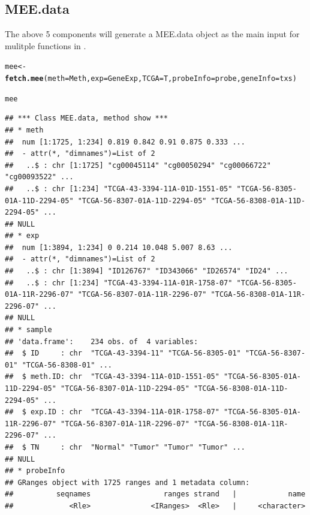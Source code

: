 \documentclass{article}\usepackage[]{graphicx}\usepackage[usenames,dvipsnames]{color}
\makeatletter
\newcommand{\hlstd}[1]{\textcolor[rgb]{0.345,0.345,0.345}{#1}}%
\newcommand{\hlkwb}[1]{\textcolor[rgb]{0.69,0.353,0.396}{#1}}%
\newcommand{\hlkwc}[1]{\textcolor[rgb]{0.333,0.667,0.333}{#1}}%
\newcommand{\hlkwd}[1]{\textcolor[rgb]{0.737,0.353,0.396}{\textbf{#1}}}%
\newenvironment{kframe}{%
 \def\at@end@of@kframe{}%
 \ifinner\ifhmode%
  \def\at@end@of@kframe{\end{minipage}}%
  \begin{minipage}{\columnwidth}%
 \fi\fi%
 \def\FrameCommand##1{\hskip\@totalleftmargin \hskip-\fboxsep
 \colorbox{shadecolor}{##1}\hskip-\fboxsep
     \hskip-\linewidth \hskip-\@totalleftmargin \hskip\columnwidth}%
 \MakeFramed {\advance\hsize-\width
   \@totalleftmargin\z@ \linewidth\hsize
   \@setminipage}}%
 {\par\unskip\endMakeFramed%
 \at@end@of@kframe}
\newenvironment{knitrout}{}{} %
\makeatother
\begin{document}
\subsection{MEE.data}
The above 5 components will generate a MEE.data object as the main input for mulitple functions 
in .

\begin{knitrout}
\color{fgcolor}\begin{kframe}
\begin{alltt}
\hlstd{mee} \hlkwb{<-} \hlkwd{fetch.mee}\hlstd{(}\hlkwc{meth}\hlstd{=Meth,} \hlkwc{exp}\hlstd{=GeneExp,} \hlkwc{TCGA}\hlstd{=T,} \hlkwc{probeInfo}\hlstd{=probe,} \hlkwc{geneInfo}\hlstd{=txs)}
\end{alltt}


{\ttfamily\noindent\itshape{}}\begin{alltt}
\hlstd{mee}
\end{alltt}
\begin{verbatim}
## *** Class MEE.data, method show *** 
## * meth 
##  num [1:1725, 1:234] 0.819 0.842 0.91 0.875 0.333 ...
##  - attr(*, "dimnames")=List of 2
##   ..$ : chr [1:1725] "cg00045114" "cg00050294" "cg00066722" "cg00093522" ...
##   ..$ : chr [1:234] "TCGA-43-3394-11A-01D-1551-05" "TCGA-56-8305-01A-11D-2294-05" "TCGA-56-8307-01A-11D-2294-05" "TCGA-56-8308-01A-11D-2294-05" ...
## NULL
## * exp 
##  num [1:3894, 1:234] 0 0.214 10.048 5.007 8.63 ...
##  - attr(*, "dimnames")=List of 2
##   ..$ : chr [1:3894] "ID126767" "ID343066" "ID26574" "ID24" ...
##   ..$ : chr [1:234] "TCGA-43-3394-11A-01R-1758-07" "TCGA-56-8305-01A-11R-2296-07" "TCGA-56-8307-01A-11R-2296-07" "TCGA-56-8308-01A-11R-2296-07" ...
## NULL
## * sample 
## 'data.frame':	234 obs. of  4 variables:
##  $ ID     : chr  "TCGA-43-3394-11" "TCGA-56-8305-01" "TCGA-56-8307-01" "TCGA-56-8308-01" ...
##  $ meth.ID: chr  "TCGA-43-3394-11A-01D-1551-05" "TCGA-56-8305-01A-11D-2294-05" "TCGA-56-8307-01A-11D-2294-05" "TCGA-56-8308-01A-11D-2294-05" ...
##  $ exp.ID : chr  "TCGA-43-3394-11A-01R-1758-07" "TCGA-56-8305-01A-11R-2296-07" "TCGA-56-8307-01A-11R-2296-07" "TCGA-56-8308-01A-11R-2296-07" ...
##  $ TN     : chr  "Normal" "Tumor" "Tumor" "Tumor" ...
## NULL
## * probeInfo 
## GRanges object with 1725 ranges and 1 metadata column:
##          seqnames                 ranges strand   |            name
##             <Rle>              <IRanges>  <Rle>   |     <character>

\end{verbatim}
\end{kframe}
\end{knitrout}
\end{document}
